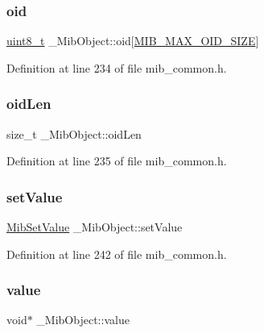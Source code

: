 \subsubsection{\texorpdfstring{oid}{oid}}
{\footnotesize\ttfamily \hyperlink{stdint_8h_aba7bc1797add20fe3efdf37ced1182c5}{uint8\+\_\+t} \+\_\+\+Mib\+Object\+::oid\mbox{[}\hyperlink{mib__common_8h_a70ab69e5198d8438346981c7b26dabca}{M\+I\+B\+\_\+\+M\+A\+X\+\_\+\+O\+I\+D\+\_\+\+S\+I\+ZE}\mbox{]}}



Definition at line 234 of file mib\+\_\+common.\+h.

\mbox{\label{struct__MibObject_a1ccab054503d3291712eacaad5ca8bd8}} 
\subsubsection{\texorpdfstring{oid\+Len}{oidLen}}
{\footnotesize\ttfamily size\+\_\+t \+\_\+\+Mib\+Object\+::oid\+Len}



Definition at line 235 of file mib\+\_\+common.\+h.

\mbox{\label{struct__MibObject_ae8ed71dfa3bb37ecdb2459ba47bb4ace}} 
\subsubsection{\texorpdfstring{set\+Value}{setValue}}
{\footnotesize\ttfamily \hyperlink{mib__common_8h_a4bceed7ee27e3ff74aab6f92f774e9ac}{Mib\+Set\+Value} \+\_\+\+Mib\+Object\+::set\+Value}



Definition at line 242 of file mib\+\_\+common.\+h.

\mbox{\label{struct__MibObject_a4309d51a49efdf9609f2539827825dda}} 
\subsubsection{\texorpdfstring{value}{value}}
{\footnotesize\ttfamily void$\ast$ \+\_\+\+Mib\+Object\+::value}



